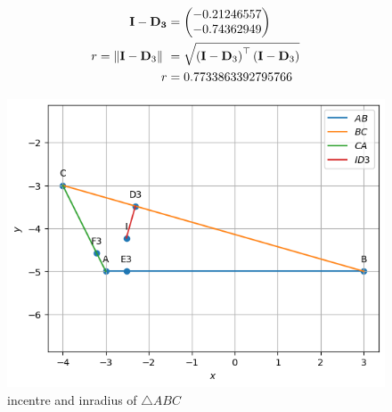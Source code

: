 \documentclass[11pt]{book}
\begin{document}
\begin{enumerate}[label=\thesection.\arabic*.,ref=\thesection.\theenumi]
\begin{enumerate}
\begin{align}
       \vec{I - D_3} &= \myvec{-0.21246557 \\-0.74362949} \\
 r= \norm{\vec{I}-\vec{D}_3}\ &=  \sqrt{\brak{\vec{I}-\vec{D}_3}^{\top}\brak{\vec{I}-\vec{D}_3}} \\
 r &= 0.7733863392795766
   \end{align}
\end{enumerate}
\begin{figure}[H]
    \centering
    \includegraphics{figs/Ang_bisect2.png}
    \caption{incentre and inradius of $\triangle ABC$}
    \label{fig:Ang_bisect2}
\end{figure}


\end{enumerate}
\end{document}
